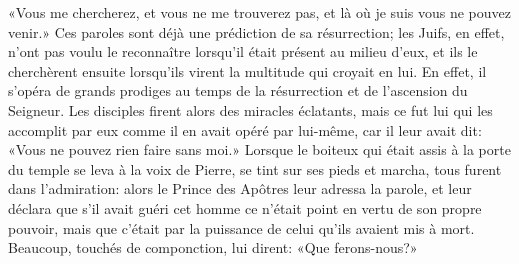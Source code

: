 «Vous me chercherez, et vous ne me trouverez pas,
	et là où je suis vous ne pouvez venir.»
Ces paroles sont déjà une prédiction de sa résurrection;
	les Juifs, en effet, n’ont pas voulu le reconnaître
	lorsqu’il était présent au milieu d’eux,
	et ils le cherchèrent ensuite
		lorsqu’ils virent la multitude qui croyait en lui.
En effet, il s’opéra de grands prodiges
	au temps de la résurrection et de l’ascension du Seigneur.
Les disciples firent alors des miracles éclatants,
	mais ce fut lui qui les accomplit par eux
		comme il en avait opéré par lui-même, car il leur avait dit:
	«Vous ne pouvez rien faire sans moi.»
Lorsque le boiteux qui était assis à la porte du temple
	se leva à la voix de Pierre, se tint sur ses pieds et marcha,
	tous furent dans l’admiration:
	alors le Prince des Apôtres leur adressa la parole,
	et leur déclara que s’il avait guéri cet homme
	ce n’était point en vertu de son propre pouvoir,
	mais que c’était par la puissance de celui qu’ils avaient mis à mort.
Beaucoup, touchés de componction, lui dirent: «Que ferons-nous?»
